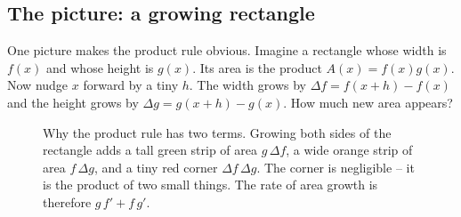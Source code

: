 \subsection{The picture: a growing rectangle}

One picture makes the product rule obvious. Imagine a rectangle whose width is
$f(x)$ and whose height is $g(x)$. Its area is the product $A(x)=f(x)g(x)$. Now nudge $x$
forward by a tiny $h$. The width grows by $\Delta f = f(x+h)-f(x)$ and the height grows by
$\Delta g = g(x+h)-g(x)$. How much new area appears?

\begin{figure}[H]
\centering
{}
\caption{Why the product rule has two terms. Growing both sides of the rectangle adds a
tall green strip of area $g\,\Delta f$, a wide orange strip of area $f\,\Delta g$, and a
tiny red corner $\Delta f\,\Delta g$. The corner is negligible -- it is the product of two
small things. The rate of area growth is therefore $g\,f' + f\,g'$.}
\label{ch11:fig-product}
\end{figure}

